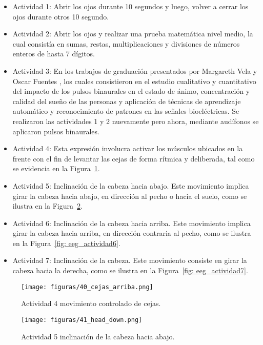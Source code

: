 \begin{itemize}    
    \item Actividad 1:
    Abrir los ojos durante 10 segundos y luego, volver a cerrar los ojos durante otros 10 segundo.       
    \item Actividad 2:
    Abrir los ojos y realizar una prueba matemática nivel medio, la cual consistía en sumas, restas, multiplicaciones y divisiones de números enteros de hasta 7 dígitos.    
    \item Actividad 3:
    En los trabajos de graduación presentados por Margareth Vela \cite{magy_2023} y Oscar Fuentes \cite{oscar_2023}, los cuales consistieron en el estudio cualitativo y cuantitativo del impacto de los pulsos binaurales en el estado de ánimo, concentración y calidad del sueño de las personas y aplicación de técnicas de aprendizaje automático y reconocimiento de patrones en las señales bioeléctricas. Se realizaron las actividades 1 y 2 nuevamente pero ahora, mediante audífonos se aplicaron pulsos binaurales.    
    \item  Actividad 4:
    Esta expresión involucra activar los músculos ubicados en la frente con el fin de levantar las cejas de forma rítmica y deliberada, tal como se evidencia en la Figura~\ref{fig: eeg_actividad4}.    
    \item Actividad 5:
    Inclinación de la cabeza hacia abajo. Este movimiento implica girar la cabeza hacia abajo, en dirección al pecho o hacia el suelo, como se ilustra en la Figura~\ref{fig: eeg_actividad5}.    
    \item Actividad 6:
    Inclinación de la cabeza hacia arriba. Este movimiento implica girar la cabeza hacia arriba, en dirección contraria al pecho, como se ilustra en la Figura~\ref{fig: eeg_actividad6}.    
    \item Actividad 7:
    Inclinación de la cabeza. Este movimiento consiste en girar la cabeza hacia la derecha, como se ilustra en la Figura~\ref{fig: eeg_actividad7}.
\end{itemize}

\begin{figure}[H]
	\centering
	\texttt{[image: figuras/40\_cejas\_arriba.png]}
	\caption{Actividad 4 movimiento controlado de cejas.}
	\label{fig: eeg_actividad4}
\end{figure}

\begin{figure}[H]
	\centering
	\texttt{[image: figuras/41\_head\_down.png]}
	\caption{Actividad 5 inclinación de la cabeza hacia abajo.}
	\label{fig: eeg_actividad5}
\end{figure}

